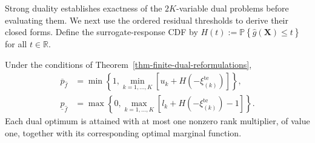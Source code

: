Strong duality establishes exactness of the $2K$-variable dual problems before evaluating them. We next use the ordered residual thresholds to derive their closed forms. Define the surrogate-response CDF by $H(t):=\mathbb P\left\{\hat g(\bm X)\le t\right\}$ for all $t\in\mathbb R$.

\begin{corollary}
  \label{thm-closed-form-bounds}
  Under the conditions of Theorem~\ref{thm-finite-dual-reformulations},
  \begin{align}
    \overline p_{\hat f}
    &=\min\left\{1,\min_{k=1,\ldots,K}\left[u_k+H\left(-\xi_{(k)}^{\mathrm{te}}\right)\right]\right\},
    \label{eq-dw-closed-upper}\\
    \underline p_{\hat f}
    &=\max\left\{0,\max_{k=1,\ldots,K}\left[l_k+H\left(-\xi_{(k)}^{\mathrm{te}}\right)-1\right]\right\}.
    \label{eq-dw-closed-lower}
  \end{align}
  Each dual optimum is attained with at most one nonzero rank multiplier, of value one, together with its corresponding optimal marginal function.
\end{corollary}
